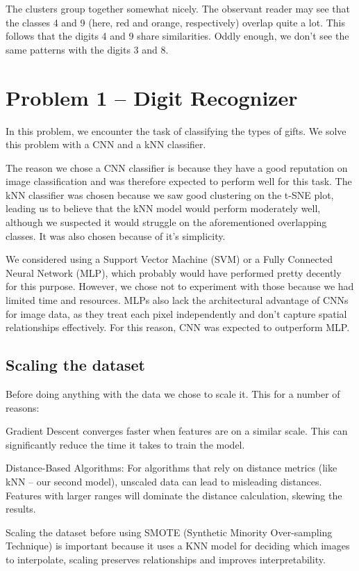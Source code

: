 \documentclass{article}
\begin{document}
The clusters group together somewhat nicely. The observant reader may see that the classes 4 and 9 (here, red and orange, respectively) overlap quite a lot. This follows that the digits 4 and 9 share similarities. Oddly enough, we don't see the same patterns with the digits 3 and 8.

\section{Problem 1 – Digit Recognizer}

In this problem, we encounter the task of classifying the types of gifts. We solve this problem with a CNN and a kNN classifier.

The reason we chose a CNN classifier is because they have a good reputation on image classification and was therefore expected to perform well for this task. The kNN classifier was chosen because we saw good clustering on the t-SNE plot, leading us to believe that the kNN model would perform moderately well, although we suspected it would struggle on the aforementioned overlapping classes. It was also chosen because of it's simplicity.

We considered using a Support Vector Machine (SVM) or a Fully Connected Neural Network (MLP), which probably would have performed pretty decently for this purpose. However, we chose not to experiment with those because we had limited time and resources. MLPs also lack the architectural advantage of CNNs for image data, as they treat each pixel independently and don’t capture spatial relationships effectively. For this reason, CNN was expected to outperform MLP.

\subsection{Scaling the dataset}

Before doing anything with the data we chose to scale it. This for a number of reasons:

Gradient Descent converges faster when features are on a similar scale. This can significantly reduce the time it takes to train the model. 

Distance-Based Algorithms: For algorithms that rely on distance metrics (like kNN – our second model), unscaled data can lead to misleading distances. Features with larger ranges will dominate the distance calculation, skewing the results.

Scaling the dataset before using SMOTE (Synthetic Minority Over-sampling Technique) is important because  it uses a KNN model for deciding which images to  interpolate, scaling preserves relationships and improves interpretability.
\end{document}
